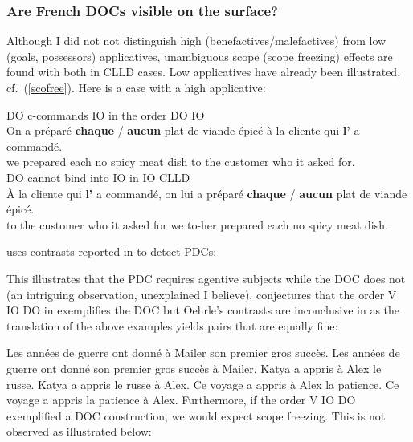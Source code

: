 \documentclass[output=paper]{langsci/langscibook}
\begin{document}
\subsubsection{Are French \glspl{DOC} visible on the surface?}

Although I did not not distinguish high (benefactives/malefactives) from low
(goals, possessors) applicatives, unambiguous scope (scope freezing) effects
are found with both in \gls{CLLD} cases. Low
applicatives have already been illustrated, cf.\ (\ref{scofree}). Here is a
case with a high applicative:

\ea\label{doio6}
    \ea DO c-commands IO in the order DO IO\\
    \gll {}On {a pr\'{e}par\'{e}} \textbf{chaque} / \textbf{aucun} {plat
    de viande \'epic\'e} \`{a} la cliente qui {\bf l'} {a command\'e}.\\
     we prepared each {} no {spicy meat dish}  to the customer who it {asked for}.\\
    \ex DO cannot bind into IO in IO CLLD\\
    \gll \llap{*}À la cliente qui \textbf{l'} {a commandé}, on lui a  préparé
        \textbf{chaque} / \textbf{aucun} {plat de viande épicé}.\\
         to the customer who it {asked for} we to-her {} prepared each {} no
        {spicy meat dish}.\\
\z
\z


\citet{anagnostopoulou2005cross} uses contrasts reported in \citet{Oehrle:1976}
to detect \glspl{PDC}:

\ea
    \z
\ex {}
\z
\ex
{}
\z
\z

This illustrates that the \gls{PDC}
requires agentive subjects while the \gls{DOC} does not (an intriguing
observation, unexplained  I believe).  \citet{anagnostopoulou2005cross}
conjectures that the order V IO DO in  exemplifies the
\gls{DOC} but Oehrle's contrasts are
inconclusive in  as the translation of the above examples yields pairs
that are equally fine:

\ea \ea Les ann\'ees de guerre ont donn\'e \`a Mailer son premier gros
succ\`es.
\ex Les ann\'ees de guerre ont donn\'e son premier gros succ\`es \`a Mailer.
\z
\ex \ea Katya a appris \`a Alex le russe.
\ex Katya a appris le russe  \`a Alex.
\z
\ex \ea Ce voyage a appris \`a Alex la patience.
\ex Ce voyage a appris la patience  \`a Alex.
\z
\z
%
Furthermore, if the order V IO DO exemplified a \gls{DOC} construction, we
would expect scope freezing. This is not observed as illustrated below:
\end{document}
